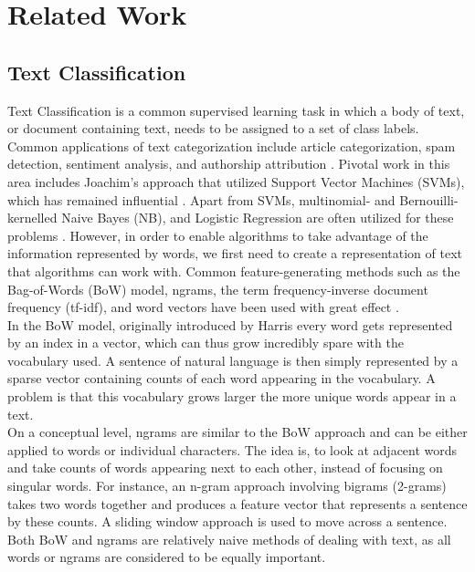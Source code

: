 \chapter{Related Work}\label{ch:rel}
\section{Text Classification}

Text Classification is a common supervised learning task in which a body of text, or document containing text, needs to be assigned to a set of class labels. Common applications of text categorization include article categorization, spam detection, sentiment analysis, and authorship attribution \cite{Sebastiani2002, Croft, Shrestha}. Pivotal work in this area includes Joachim’s approach that utilized Support Vector Machines (SVMs), which has remained influential \cite{Joachims1998}. Apart from SVMs, multinomial- and Bernouilli-kernelled Naive Bayes (NB), and Logistic Regression are often utilized for these problems \cite{Croft, Wang2012}. However, in order to enable algorithms to take advantage of the information represented by words, we first need to create a representation of text that algorithms can work with. Common feature-generating methods such as the Bag-of-Words (BoW) model, ngrams, the term frequency-inverse document frequency (tf-idf), and word vectors have been used with great effect \cite{Manning2008}.\\

In the BoW model, originally introduced by Harris \cite{Harris1954} every word gets represented by an index in a vector, which can thus grow incredibly spare with the vocabulary used. A sentence of natural language is then simply represented by a sparse vector containing counts of each word appearing in the vocabulary. A problem is that this vocabulary grows larger the more unique words appear in a text.\\ 

On a conceptual level, ngrams are similar to the BoW approach and can be either applied to words or individual characters. The idea is, to look at adjacent words and take counts of words appearing next to each other, instead of focusing on singular words. For instance, an n-gram approach involving bigrams (2-grams) takes two words together and produces a feature vector that represents a sentence by these counts. A sliding window approach is used to move across a sentence. Both BoW and ngrams are relatively naive methods of dealing with text, as all words or ngrams are considered to be equally important. \\

